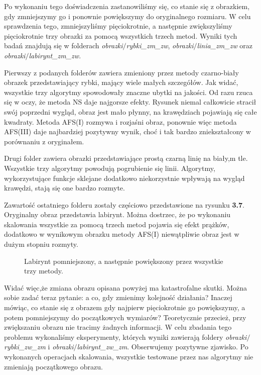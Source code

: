 Po wykonaniu tego doświadczenia zastanowiliśmy się, co stanie się z obrazkiem, gdy zmniejszymy go i ponownie powiększymy do oryginalnego rozmiaru.
W celu sprawdzenia tego, zmniejszyliśmy pięciokrotnie, a następnie zwiększyliśmy pięciokrotnie trzy obrazki za pomocą wszystkich trzech metod.
Wyniki tych badań znajdują się w folderach \textit{obrazki$\slash$rybki\_zm\_zw},
\textit{obrazki$\slash$linia\_zm\_zw} oraz \textit{obrazki$\slash$labirynt\_zm\_zw}.

Pierwszy z podanych folderów zawiera zmieniony przez metody czarno-biały obrazek
przedstawiający rybki, mający wiele małych szczegółów. Jak widać, wszystkie
trzy algorytmy spowodowały znaczne ubytki na jakości. Od razu rzuca się w oczy,
że metoda NS daje najgorsze efekty. Rysunek niemal całkowicie stracił swój poprzedni wygląd, obraz jest mało płynny, 
na krawędziach pojawiają się całe kwadraty. Metoda AFS(I) rozmywa i rozjaśni obraz, ponownie więc metoda 
AFS(III) daje najbardziej pozytywny wynik, choć i tak bardzo zniekształcony w porównaniu z oryginałem.

Drugi folder zawiera obrazki przedstawiające prostą czarną linię na biały,m tle.
Wszystkie trzy algorytmy powodują pogrubienie się linii. Algorytmy, wykorzystujące
funkcje sklejane dodatkowo niekorzystnie wpływają na wygląd krawędzi, stają się
one bardzo rozmyte.

Zawartość ostatniego folderu zostały częściowo przedstawione na rysunku \textbf{3.7}.
Oryginalny obraz przedstawia labirynt. Można dostrzec, że po wykonaniu skalowania
wszystkie za pomocą trzech metod pojawia się efekt prążków, dodatkowo w wynikowym
obrazku metody AFS(I) niewątpliwie obraz jest w dużym stopniu rozmyty.
\begin{figure}[h!tb]
\begin{center}
\caption{Labirynt pomniejszony, a następnie powiększony przez wszystkie trzy metody.}
\end{center}
\end{figure}

Widać więc,że zmiana obrazu opisana powyżej ma katastrofalne skutki. Można sobie
zadać teraz pytanie: a co, gdy zmienimy kolejność działania? Inaczej mówiąc,
co stanie się z obrazem gdy najpierw pięciokrotnie go powiększymy, a potem pomniejszymy do początkowych wymiarów?
Teoretycznie przecież, przy zwiększaniu obrazu nie tracimy żadnych informacji.
W celu zbadania tego problemu wykonaliśmy eksperymenty, których wyniki zawierają foldery
\textit{obrazki$\slash$rybki\_zw\_zm} i \textit{obrazki$\slash$labirynt\_zw\_zm}.
Obserwujemy pozytywne zjawisko. Po wykonanych operacjach skalowania,
wszystkie testowane przez nas algorytmy nie zmieniają początkowego obrazu.

